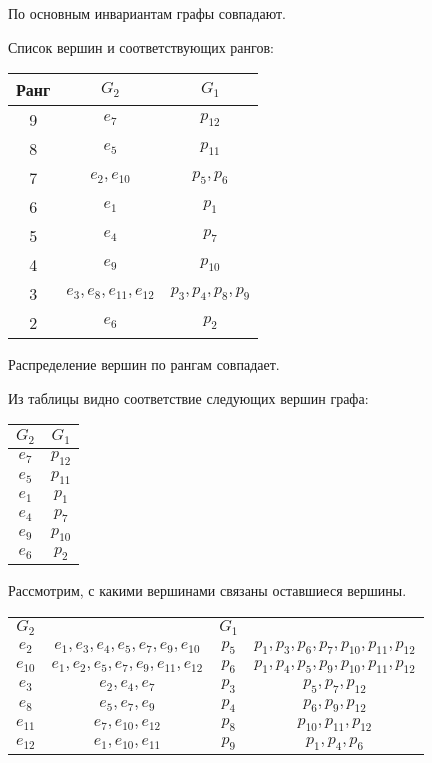 \documentclass[12pt, a4paper] {ncc}
\begin{document}
По основным инвариантам графы совпадают.

Список вершин и соответствующих рангов:

\begin{tabular}{|c|c c|}
\hline
\bf Ранг & $G_2$ & $G_1$ \\
\hline
9 & $e_7$                     & $p_{12}$ \\
8 & $e_5$                     & $p_{11}$ \\
7 & $e_2, e_{10}$             & $p_5, p_6$ \\
6 & $e_1$                     &  $p_1$\\
5 & $e_4$                     & $p_7$ \\
4 & $e_9$                     & $p_{10}$\\
3 & $e_3, e_8, e_{11}, e_{12}$& $p_3, p_4, p_8, p_9$\\
2 & $e_6$                     & $p_2$\\
\hline
\end{tabular}

Распределение вершин по рангам совпадает.

Из таблицы видно соответствие следующих вершин графа:

\begin{tabular}{|cc|}
\hline
$G_2$ & $G_1$ \\ \hline
$e_7$ & $p_{12}$ \\
$e_5$ & $p_{11}$ \\
$e_1$ & $p_1$ \\
$e_4$ & $p_7$ \\
$e_9$ & $p_{10}$ \\
$e_6$ & $p_2$ \\
\hline
\end{tabular}

Рассмотрим, с какими вершинами связаны оставшиеся вершины.

\begin{tabular}{|c c||c c|}
\hline
$G_2$    &                                          & $G_1$ & \\
$e_2$    & $e_1, e_3, e_4, e_5, e_7, e_9, e_{10}$   & $p_{5}$ & $p_1, p_3, p_6, p_7, p_{10}, p_{11}, p_{12}$ \\
$e_{10}$ & $e_1, e_2, e_5, e_7, e_9, e_{11}, e_{12}$& $p_{6}$ & $p_1, p_4, p_5, p_9, p_{10}, p_{11}, p_{12}$ \\
$e_3$    & $e_2, e_4, e_7$                          & $p_{3}$ & $p_5, p_7, p_{12}$ \\
$e_8$    & $e_5, e_7, e_9$                          & $p_{4}$ & $p_6, p_9, p_{12}$ \\ 
$e_{11}$ & $e_7, e_{10}, e_{12}$                    & $p_{8}$ & $p_{10}, p_{11}, p_{12}$ \\ 
$e_{12}$ & $e_1, e_{10}, e_{11}$                    & $p_{9}$ & $p_1, p_4, p_6$ \\
\hline
\end{tabular}
\end{document}
